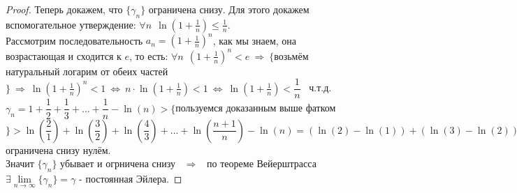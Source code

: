 \documentclass[12pt]{article}
\begin{document}
\begin{proof}
     Теперь докажем, что $\{\gamma_n\}$ ограничена снизу. Для этого докажем вспомогательное утверждение: $\forall n \ \  \ln\left(1+\frac{1}{n}\right) \leq \frac1n$. \\
     Рассмотрим последовательность $a_n = \left(1 + \frac1n\right)^n$, как мы знаем, она возрастающая и сходится к $e$, то есть: $\forall n  \ \ \left(1+\frac{1}{n}\right)^n < e \ \Rightarrow \ \{$возьмём натуральный логарим от обеих частей$\} \ \Rightarrow \ \ln\left(1 + \frac1n\right)^n < 1 \ \Leftrightarrow \ n \cdot \ln\left(1 + \frac1n\right) < 1 \ \Leftrightarrow \  \ln\left(1 + \frac1n\right) < \dfrac{1}{n}$ \ ч.т.д. \\
     $\gamma_n = 1 + \dfrac12 + \dfrac13 + ... + \dfrac1n - \ln(n) > \{$пользуемся доказанным выше фатком$\} >  \ln\left( \dfrac21 \right) + \ln\left( \dfrac32 \right) + \ln\left( \dfrac43 \right) + ... + \ln\left( \dfrac{n+1}n \right) - \ln(n) = (\ln(2) - \ln(1)) + (\ln(3) - \ln(2)) + (\ln(4) - \ln(3)) + ... + (\ln(n+1) - \ln(n)) - \ln(n) = \ln(n+1) - \ln(n) = \ln\left( \dfrac{n+1}{n} \right) = \ln\left( 1+ \dfrac{1}{n} \right) > 0 \ \Rightarrow \ \{\gamma_n\}$ ограничена снизу нулём.  \\
     Значит $\{\gamma_n\}$ убывает и огрничена снизу \  $\Rightarrow$ \ по теореме Вейерштрасса $\exists \lim\limits_{n \to \infty} \{\gamma_n\} = \gamma$ - постоянная Эйлера. 
 \end{proof}

\sloppy
\end{document}
